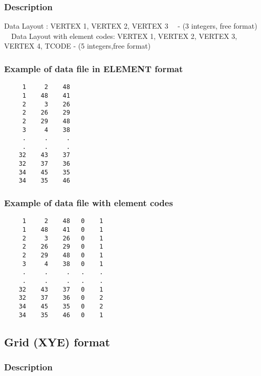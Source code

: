 \documentclass{article}
\begin{document}
\subsubsection[Description]{Description}

\bigskip

Data Layout :\newline
VERTEX 1, VERTEX 2, VERTEX 3 \ \ {}- (3 integers, free format)\newline
\ \ Data Layout with element codes:\newline
VERTEX 1, VERTEX 2, VERTEX 3, VERTEX 4, TCODE - (5 integers,free format)

\subsubsection{Example of data file in ELEMENT format}
\begin{small}
\begin{lstlisting}
     1     2    48
     1    48    41
     2     3    26
     2    26    29
     2    29    48
     3     4    38
     .     .     .
     .     .     .
    32    43    37
    32    37    36
    34    45    35
    34    35    46
\end{lstlisting}
\end{small}


\subsubsection{Example of data file with element codes}
\begin{small}
\begin{lstlisting}
     1     2    48   0    1
     1    48    41   0    1
     2     3    26   0    1
     2    26    29   0    1
     2    29    48   0    1
     3     4    38   0    1
     .     .     .   .    .
     .     .     .   .    .
    32    43    37   0    1
    32    37    36   0    2
    34    45    35   0    2
    34    35    46   0    1
\end{lstlisting}
\end{small}

\newpage
\subsection[Grid (XYE) format]{Grid (XYE) format}
\subsubsection[Description]{Description}
\end{document}
